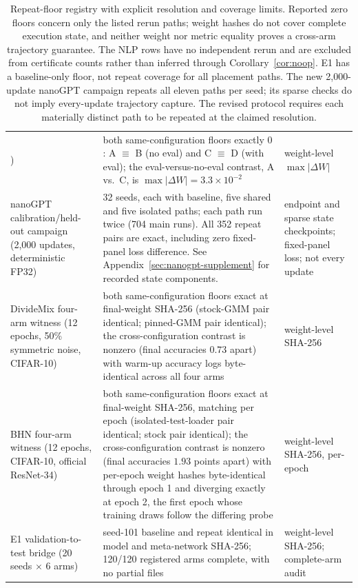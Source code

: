 \begin{table}[tbp]
\begin{tabular}{@{}L{4.4cm}L{7.6cm}L{3.2cm}@{}}
) &
both same-configuration floors exactly $0$: A $\equiv$ B (no eval) and
C $\equiv$ D (with eval); the eval-versus-no-eval contrast, A vs.\ C, is
$\max|\Delta W| = 3.3{\times}10^{-2}$ &
weight-level $\max|\Delta W|$ \\
\addlinespace
nanoGPT calibration/held-out campaign (2,000 updates, deterministic FP32) &
32 seeds, each with baseline, five shared and five isolated paths;
each path run twice (704 main runs). All 352 repeat pairs are exact,
including zero fixed-panel loss difference.
See Appendix~\ref{sec:nanogpt-supplement} for recorded state components. &
endpoint and sparse state checkpoints; fixed-panel loss; not every update \\
\addlinespace
DivideMix four-arm witness (12 epochs, 50\% symmetric noise, CIFAR-10) &
both same-configuration floors exact at final-weight SHA-256 (stock-GMM
pair identical; pinned-GMM pair identical); the cross-configuration
contrast is nonzero (final accuracies $0.73$ apart) with warm-up
accuracy logs byte-identical across all four arms &
weight-level SHA-256 \\
\addlinespace
BHN four-arm witness (12 epochs, CIFAR-10, official ResNet-34) &
both same-configuration floors exact at final-weight SHA-256, matching
per epoch (isolated-test-loader pair identical; stock pair identical);
the cross-configuration contrast is nonzero (final accuracies $1.93$
points apart) with per-epoch weight hashes byte-identical through epoch
1 and diverging exactly at epoch 2, the first epoch whose training draws
follow the differing probe &
weight-level SHA-256, per-epoch \\
\addlinespace
E1 validation-to-test bridge (20 seeds $\times$ 6 arms) &
seed-101 baseline and repeat identical in model and meta-network
SHA-256; 120/120 registered arms complete, with no partial files &
weight-level SHA-256; complete-arm audit \\
\bottomrule
\end{tabular}
\caption{Repeat-floor registry with explicit resolution and
coverage limits. Reported zero floors concern only the listed rerun paths;
weight hashes do not cover complete execution state, and neither weight
nor metric equality proves a cross-arm trajectory guarantee. The NLP rows
have no independent rerun and are excluded from certificate counts rather
than inferred through Corollary~\ref{cor:noop}. E1 has a baseline-only floor,
not repeat coverage for all placement paths. The new 2,000-update nanoGPT
campaign repeats all eleven paths per seed; its sparse checks do not imply
every-update trajectory capture. The revised protocol requires each
materially distinct path to be repeated at the claimed resolution.}
\label{tab:floors}
\end{table}

